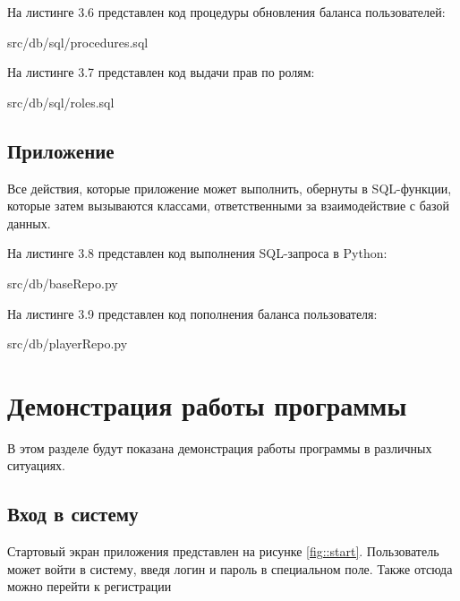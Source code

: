 \newpage
На листинге 3.6 представлен код процедуры обновления баланса пользователей:
\FloatBarrier
\begin{lstinputlisting}[language=SQL, caption=Обновление балансов пользователй, linerange = {112-134},
	basicstyle=\footnotesize\ttfamily, frame=single,breaklines=true]{src/db/sql/procedures.sql}
\end{lstinputlisting}
\FloatBarrier

На листинге 3.7 представлен код выдачи прав по ролям:
\FloatBarrier
\begin{lstinputlisting}[language=SQL, caption=Выдача прав ролям, 
	basicstyle=\footnotesize\ttfamily, frame=single,breaklines=true]{src/db/sql/roles.sql}
\end{lstinputlisting}
\FloatBarrier

\subsection{Приложение}
Все действия, которые приложение может выполнить, обернуты в SQL-функции, которые затем вызываются классами, ответственными за взаимодействие с базой данных.

На листинге 3.8 представлен код выполнения SQL-запроса в Python:
\FloatBarrier
\begin{lstinputlisting}[language=Python, caption=Выполнение SQL-запроса, linerange = {11-28},
	basicstyle=\footnotesize\ttfamily, frame=single,breaklines=true]{src/db/baseRepo.py}
\end{lstinputlisting}
\FloatBarrier

На листинге 3.9 представлен код пополнения баланса пользователя:
\FloatBarrier
\begin{lstinputlisting}[language=Python, caption=Пополнение баланса пользователя, linerange = {44-47},
	basicstyle=\footnotesize\ttfamily, frame=single,breaklines=true]{src/db/playerRepo.py}
\end{lstinputlisting}
\FloatBarrier

\section{Демонстрация работы программы}
В этом разделе будут показана демонстрация работы программы в различных ситуациях.

\subsection{Вход в систему}
Стартовый экран приложения представлен на рисунке \ref{fig::start}. 
Пользователь может войти в систему, введя логин и пароль в специальном поле.
Также отсюда можно перейти к регистрации

